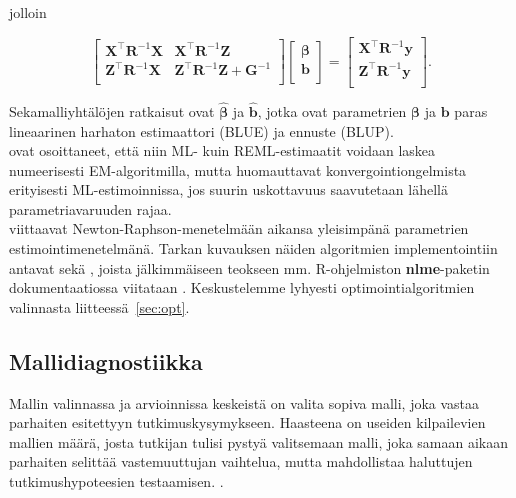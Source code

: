 \documentclass[finnish]{docopts}
\begin{document}
jolloin

$$
\begin{bmatrix}
\bm{X}^\top \bm{R}^{-1} \bm{X} & \bm{X}^\top \bm{R}^{-1} \bm{Z} \\
\bm{Z}^\top \bm{R}^{-1} \bm{X} & \bm{Z}^\top \bm{R}^{-1} \bm{Z} + \bm{G}^{-1}\\
\end{bmatrix}
\begin{bmatrix}
\bm{\beta} \\
\bm{b}\\
\end{bmatrix}
=
\begin{bmatrix}
\bm{X}^\top \bm{R}^{-1} \bm{y} \\
\bm{Z}^\top \bm{R}^{-1} \bm{y}\\
\end{bmatrix}.
$$

Sekamalliyhtälöjen ratkaisut ovat $\hat{\bm{\beta}}$ ja $\hat{\bm{b}}$, jotka ovat parametrien $\bm{\beta}$ ja $\bm{b}$ paras lineaarinen harhaton estimaattori (BLUE) ja ennuste (BLUP).\\

\cite{laird82} ovat osoittaneet, että niin ML- kuin REML-estimaatit voidaan laskea numeerisesti EM-algoritmilla, mutta huomauttavat konvergointiongelmista erityisesti ML-estimoinnissa, jos suurin uskottavuus saavutetaan lähellä parametriavaruuden rajaa.\\

\cite{verbeke00} viittaavat Newton-Raphson-menetelmään aikansa yleisimpänä parametrien estimointimenetelmänä. Tarkan kuvauksen näiden algoritmien implementointiin antavat \cite{lindstrom88} sekä \cite{lindstrom90}, joista jälkimmäiseen teokseen mm. R-ohjelmiston \citep{rsoftware} \textbf{nlme}-paketin dokumentaatiossa viitataan \citep{nlme13}. Keskustelemme lyhyesti optimointialgoritmien valinnasta liitteessä~\ref{sec:opt}.\\

\subsection{Mallidiagnostiikka}
\label{sub:mallidiag}

Mallin valinnassa ja arvioinnissa keskeistä on valita sopiva malli, joka vastaa parhaiten esitettyyn tutkimuskysymykseen. Haasteena on useiden kilpailevien mallien määrä, josta tutkijan tulisi pystyä valitsemaan malli, joka samaan aikaan parhaiten selittää vastemuuttujan vaihtelua, mutta mahdollistaa haluttujen tutkimushypoteesien testaamisen. \citep{west14}.\\
\end{document}
